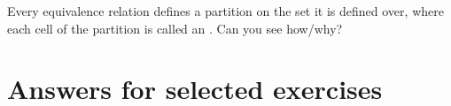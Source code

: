 \documentclass[11pt]{article}
\begin{document}
\begin{uexercise}\label{ex-equi}
Every equivalence relation defines a partition on the set it is
defined over, where each cell of the partition is called an . Can you see how/why?
\end{uexercise}


% 

\appendix
\section{Answers for selected exercises}
\end{document}
